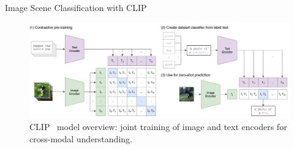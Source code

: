   
  \begin{refsection}
  \begin{frame}{Image Scene Classification with CLIP}
    \begin{figure}
      \centering
      \includegraphics[width=\linewidth]{figs/clip.png}
      \caption{\scriptsize CLIP~\parencite{radfordLearningTransferableVisual2021} model overview: joint training of image and text encoders for cross-modal understanding.}
    \end{figure}

    \bottomleftrefs
  \end{frame}
  \end{refsection}
  
